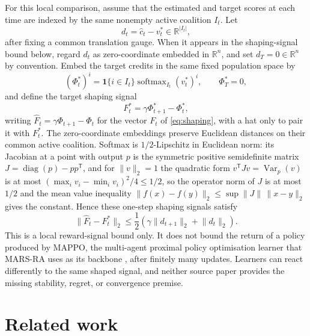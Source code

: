 \documentclass{article}
\begin{document}
For this local comparison, assume that the estimated and target scores at each time are indexed by the same nonempty active coalition \(I_t\). Let
\begin{equation}
 d_t=\widehat c_t-v_t^*\in\mathbb R^{|I_t|},
\end{equation}
after fixing a common translation gauge. When it appears in the shaping-signal bound below, regard \(d_t\) as zero-coordinate embedded in \(\mathbb R^n\), and set \(d_T=0\in\mathbb R^n\) by convention. Embed the target credits in the same fixed population space by
\begin{equation}
 (\Phi_t^*)^i=\mathbf 1\{i\in I_t\}
 \operatorname{softmax}_{I_t}(v_t^*)^i,
 \qquad \Phi_T^*=0,
\end{equation}
and define the target shaping signal
\begin{equation}
 F_t^*=\gamma\Phi_{t+1}^*-\Phi_t^*,
\end{equation}
writing \(\widehat F_t=\gamma\Phi_{t+1}-\Phi_t\) for the vector \(F_t\) of \eqref{eq:shaping}, with a hat only to pair it with \(F_t^*\).
The zero-coordinate embeddings preserve Euclidean distances on their common active coalition. Softmax is \(1/2\)-Lipschitz in Euclidean norm: its Jacobian at a point with output \(p\) is the symmetric positive semidefinite matrix \(J=\operatorname{diag}(p)-pp^{\mathsf T}\), and for \(\lVert v\rVert_2=1\) the quadratic form \(v^{\mathsf T}Jv=\operatorname{Var}_p(v)\) is at most \((\max_i v_i-\min_i v_i)^2/4\le 1/2\), so the operator norm of \(J\) is at most \(1/2\) and the mean value inequality \(\lVert f(x)-f(y)\rVert_2\le\sup\lVert J\rVert\,\lVert x-y\rVert_2\) gives the constant. Hence these one-step shaping signals satisfy
\begin{equation}
 \lVert\widehat F_t-F_t^*\rVert_2
 \leq \frac12\left(
  \gamma\lVert d_{t+1}\rVert_2+\lVert d_t\rVert_2
 \right).
 \label{eq:local}
\end{equation}
This is a local reward-signal bound only. It does not bound the return of a policy produced by MAPPO, the multi-agent proximal policy optimisation learner that MARS-RA uses as its backbone \cite{wang2026marsra}, after finitely many updates. Learners can react differently to the same shaped signal, and neither source paper provides the missing stability, regret, or convergence premise.

\section{Related work}
\end{document}
